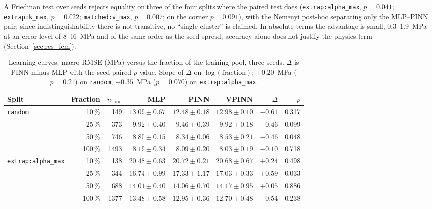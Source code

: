 A Friedman test over seeds \cite{TODO-demsar-friedman-nemenyi} rejects equality on three of the four splits where the paired test does (\texttt{extrap:alpha\_max}, $p=0.041$; \texttt{extrap:k\_max}, $p=0.022$; \texttt{matched:v\_max}, $p=0.007$; on the corner $p=0.091$), with the Nemenyi post-hoc separating only the MLP--PINN pair; since indistinguishability there is not transitive, no ``single cluster'' is claimed. In absolute terms the advantage is small, 0.3--1.9~MPa at an error level of 8--16~MPa and of the same order as the seed spread; accuracy alone does not justify the physics term (Section~\ref{sec:res_fem}).

\begin{table}[t]
\caption{Learning curves: macro-RMSE (MPa) versus the fraction of the training pool, three seeds. $\Delta$ is PINN minus MLP with the seed-paired $p$-value. Slope of $\Delta$ on $\log(\text{fraction})$: $+0.20$~MPa ($p=0.21$) on \texttt{random}, $-0.35$~MPa ($p=0.070$) on \texttt{extrap:alpha\_max}.}
\label{tab:curves}
\centering\small
\begin{tabular}{@{}lrrrrrrr@{}}
\toprule
Split & Fraction & $n_{\mathrm{train}}$ & MLP & PINN & VPINN & $\Delta$ & $p$ \\
\midrule
\texttt{random} & 10\,\%  & 149  & $13.09\pm0.67$ & $12.48\pm0.18$ & $12.98\pm0.10$ & $-0.61$ & 0.317 \\
                & 25\,\%  & 373  & $9.92\pm0.40$  & $9.46\pm0.39$  & $9.92\pm0.18$  & $-0.46$ & 0.099 \\
                & 50\,\%  & 746  & $8.80\pm0.15$  & $8.34\pm0.06$  & $8.53\pm0.21$  & $-0.46$ & 0.048 \\
                & 100\,\% & 1493 & $8.19\pm0.34$  & $8.09\pm0.20$  & $8.03\pm0.19$  & $-0.10$ & 0.718 \\
\addlinespace
\texttt{extrap:alpha\_max} & 10\,\%  & 138  & $20.48\pm0.63$ & $20.72\pm0.21$ & $20.68\pm0.67$ & $+0.24$ & 0.498 \\
                           & 25\,\%  & 344  & $16.74\pm0.99$ & $17.33\pm1.17$ & $17.03\pm0.33$ & $+0.59$ & 0.033 \\
                           & 50\,\%  & 688  & $14.01\pm0.40$ & $14.06\pm0.70$ & $14.17\pm0.95$ & $+0.05$ & 0.886 \\
                           & 100\,\% & 1377 & $13.48\pm0.58$ & $12.95\pm0.36$ & $12.70\pm0.48$ & $-0.54$ & 0.238 \\
\bottomrule
\end{tabular}
\end{table}

